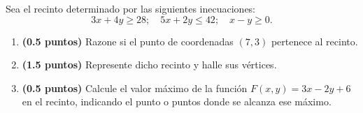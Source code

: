 
Sea el recinto determinado por las siguientes inecuaciones:
\[
3x+4y\geq28;\quad5x+2y\leq42;\quad x-y\geq0.
\]
\begin{enumerate}[label=\alph*)]
\item \textbf{(0.5 puntos)} Razone si el punto de coordenadas $(7,3)$ pertenece al recinto.
\item \textbf{(1.5 puntos)} Represente dicho recinto y halle sus vértices.
\item \textbf{(0.5 puntos)} Calcule el valor máximo de la función $F(x,y)=3x-2y+6$ en el recinto, indicando el punto o puntos donde se alcanza ese máximo.
\end{enumerate}
